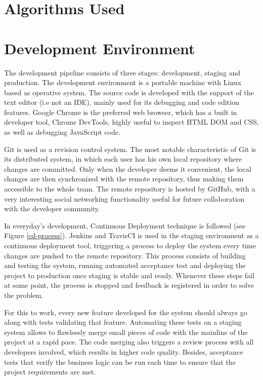 \section{Algorithms Used}


\section{Development Environment}

The development pipeline consists of three stages: development, staging and production. The development environment is a portable machine with Linux based as operative system. The source code is developed with the support of the text editor (i.e not an IDE), mainly used for its debugging and code edition features. Google Chrome is the preferred web browser, which has a built in developer tool, Chrome DevTools, highly useful to inspect HTML DOM and CSS, as well as debugging JavaScript code.

Git is used as a revision control system. The most notable characteristic of Git is its distributed system, in which each user has his own local repository where changes are committed. Only when the developer deems it convenient, the local changes are then synchronized with the remote repository, thus making them accessible to the whole team. The remote repository is hosted by GitHub, with a very interesting social networking functionality useful for future collaboration with the developer community.

In everyday’s development, Continuous Deployment technique is followed (see Figure \ref{cd-process}). Jenkins and TravisCI is used in the staging environment as a continuous deployment tool, triggering a process to deploy the system every time changes are pushed to the remote repository. This process consists of building and testing the system, running automated acceptance test and deploying the project to production once staging is stable and ready. Whenever these steps fail at some point, the process is stopped and feedback is registered in order to solve the problem.

For this to work, every new feature developed for the system should always go along with tests validating that feature. Automating these tests on a staging system allows to flawlessly merge small pieces of code with the mainline of the project at a rapid pace. The code merging also triggers a review process with all developers involved, which results in higher code quality. Besides, acceptance tests that verify the business logic can be run each time to ensure that the project requirements are met.

